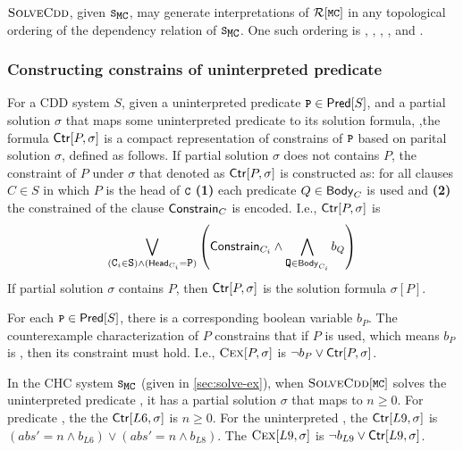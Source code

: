 %
\begin{ex}
  $\textsc{SolveCdd}$, given $\mcchc$, may generate
  interpretations of $\mcpreds$ in any topological ordering of the
  dependency relation of $\mcchc$.
  One such ordering is , , , 
   ,  and .
\end{ex}

\subsubsection{Constructing constrains of uninterpreted 
predicate}
%
For a CDD system $S$, given a uninterpreted predicate $\cc{P} \in \predof{S}$, and a partial 
solution $\sigma$ that maps some uninterpreted predicate to its solution formula, 
,the formula $\mathsf{Ctr}[P,\sigma]$ is a compact representation of constrains of $\cc{P}$ based on parital
solution $\sigma$, defined as follows.
If partial solution $\sigma$ does not contains $P$, 
the constraint of $P$ under $\sigma$ that denoted as $\mathsf{Ctr}[P,\sigma]$ 
is constructed as: for all clauses $C \in S$ in which $P$ is the head of $\cc{C}$
\textbf{(1)} each predicate $Q \in \mathsf{Body}_{C}$ is used and 
\textbf{(2)} the constrained of the clause $\mathsf{Constrain}_{C}$ is encoded.
%
I.e., $\mathsf{Ctr}[P,\sigma]$ is
\[
\biglor_{ (\cc{C}_i \in \cc{S}) \land (\headof{C_i} = \cc{P})}
\left( \consof{C_i} \land %
\bigland_{ \cc{Q} \in \bodyof{C_i}} %
b_Q \right)
\]
%
If partial solution $\sigma$ contains $P$, then $\mathsf{Ctr}[P,\sigma]$ is the solution formula $\sigma[P]$.

For each $\cc{P} \in \predof{S}$, there is a corresponding boolean variable
$b_P$.
%
The counterexample characterization of $P$ constrains that
if $P$ is used, which means $b_{P}$ is , then its constraint must hold.
%
I.e., $\textsc{Cex}[{P,\sigma}]$ is $\neg b_{P} \lor \mathsf{Ctr}[P,\sigma]$.


\begin{ex}
  \label{ex:ctr}
  In the CHC system $\mcchc$ (given in \autoref{sec:solve-ex}), 
  when $\mcsolve$ solves the uninterpreted predicate , it 
  has a partial solution $\sigma$ that maps  to $n \ge 0$.
  For predicate , the the $\mathsf{Ctr}[L6,\sigma]$ is $n \ge 0$.
  For the 
  uninterpreted , the $\mathsf{Ctr}[L9,\sigma]$ is $(abs' = n \land b_{L6}) \lor (abs' = n \land b_{L8})$.
  The $\textsc{Cex}[{L9,\sigma}]$ is $\neg b_{L9} \lor \mathsf{Ctr}[L9,\sigma]$.
\end{ex}

